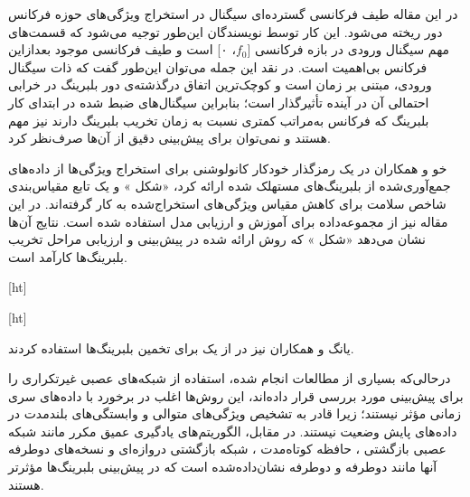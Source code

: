  در این مقاله طیف فرکانسی گسترده‌ای سیگنال در استخراج ویژگی‌های حوزه فرکانس دور ریخته می‌شود. این کار توسط نویسندگان این‌طور توجیه می‌شود که قسمت‌های مهم سیگنال ورودی در بازه فرکانسی [$f_0$، ۰] است و طیف فرکانسی موجود بعدازاین فرکانس بی‌اهمیت است. در نقد این جمله می‌توان این‌طور گفت که ذات سیگنال ورودی، مبتنی بر زمان است و کوچک‌ترین اتفاق درگذشته‌ی دور بلبرینگ در خرابی احتمالی آن در آینده تأثیرگذار است؛ بنابراین سیگنال‌های ضبط شده در ابتدای کار بلبرینگ که فرکانس به‌مراتب کمتری نسبت به زمان تخریب بلبرینگ دارند نیز مهم هستند و نمی‌توان برای پیش‌بینی دقیق از آن‌ها صرف‌نظر کرد.



خو و همکاران در  یک رمزگذار خودکار کانولوشنی برای استخراج ویژگی‌ها از داده‌های جمع‌آوری‌شده از بلبرینگ‌های مستهلک شده ارائه کرد، «شکل » و یک تابع مقیاس‌بندی شاخص سلامت برای کاهش مقیاس ویژگی‌های استخراج‌شده به کار گرفته‌اند. در این مقاله نیز از مجموعه‌داده  برای آموزش و ارزیابی مدل استفاده شده است. نتایج آن‌ها نشان می‌دهد «شکل » که روش ارائه شده در پیش‌بینی  و ارزیابی مراحل تخریب بلبرینگ‌ها کارآمد است. 


[ht]



[ht]


یانگ و همکاران نیز در  از یک  برای تخمین  بلبرینگ‌ها استفاده کردند.



درحالی‌که بسیاری از مطالعات انجام شده، استفاده از شبکه‌های عصبی غیرتکراری را برای پیش‌بینی  مورد بررسی قرار داده‌اند، این روش‌ها اغلب در برخورد با داده‌های سری زمانی مؤثر نیستند؛ زیرا قادر به تشخیص ویژگی‌های متوالی و وابستگی‌های بلندمدت در داده‌های پایش وضعیت نیستند. در مقابل، الگوریتم‌های یادگیری عمیق مکرر مانند شبکه عصبی بازگشتی ، حافظه کوتاه‌مدت ، شبکه بازگشتی دروازه‌ای  و نسخه‌های دوطرفه آنها مانند  دوطرفه  و  دوطرفه نشان‌داده‌شده است که در پیش‌بینی  بلبرینگ‌ها مؤثرتر هستند. 





